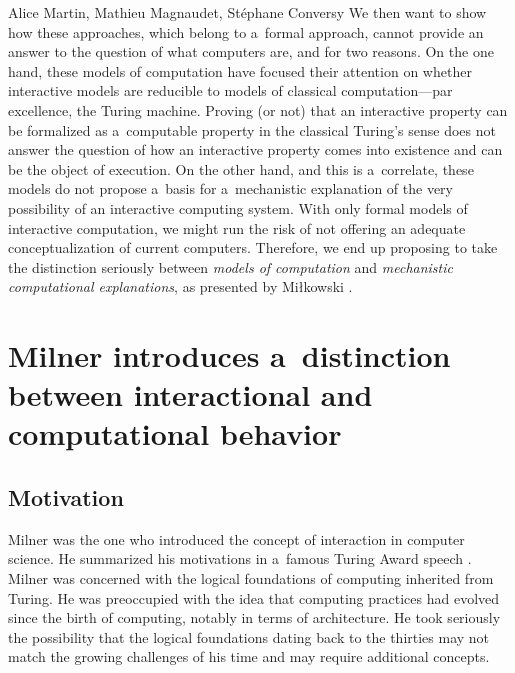 \begin{artengenv2auth}{Alice Martin, Mathieu Magnaudet, Stéphane Conversy}
We then want to show how these approaches, which belong to a~formal approach, cannot provide an answer to the question of what computers are, and for two reasons. On the one hand, these models of computation have focused their attention on whether interactive models are reducible to models of classical computation---par excellence, the Turing machine. Proving (or not) that an interactive property can be formalized as a~computable property in the classical Turing’s sense does not answer the question of how an interactive property comes into existence and can be the object of execution. On the other hand, and this is a~correlate, these models do not propose a~basis for a~mechanistic explanation of the very possibility of an interactive computing system. With only formal models of interactive computation, we might run the risk of not offering an adequate conceptualization of current computers. Therefore, we end up proposing to take the distinction seriously between \emph{models of computation} and \emph{mechanistic computational explanations}, as presented by Miłkowski \parencite*{Mikowski2011, Mikowski2014}.

\section{Milner introduces a~distinction between interactional and computational behavior}
\label{Milner}
\subsection{Motivation}

Milner was the one who introduced the concept of interaction in computer science. He summarized his motivations in a~famous Turing Award speech \parencite{Milner1993}. Milner was concerned with the logical foundations of computing inherited from Turing. He was preoccupied with the idea that computing practices had evolved since the birth of computing, notably in terms of architecture. He took seriously the possibility that the logical foundations dating back to the thirties may not match the growing challenges of his time and may require additional concepts.


\end{artengenv2auth}
